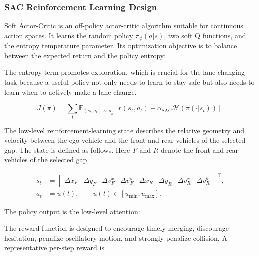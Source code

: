 \subsubsection{SAC Reinforcement Learning Design}





Soft Actor-Critic is an off-policy actor-critic algorithm suitable for continuous action spaces. It learns the random policy \(\pi_\phi(a|s)\), two soft Q functions, and the entropy temperature parameter. Its optimization objective is to balance between the expected return and the policy entropy:

The entropy term promotes exploration, which is crucial for the lane-changing task because a useful policy not only needs to learn to stay safe but also needs to learn when to actively make a lane change.



{\small
\begin{equation}
J(\pi) =
\sum_{t}
\mathbb{E}_{(s_t,a_t)\sim\rho_{\pi}}
\left[
r(s_t,a_t)
+\alpha_{\mathrm{SAC}}\mathcal{H}\left(\pi(\cdot|s_t)\right)
\right].
\end{equation}
}





The low-level reinforcement-learning state describes the relative geometry and velocity between the ego vehicle and the front and rear vehicles of the selected gap. The state is defined as follows. Here \(F\) and \(R\) denote the front and rear vehicles of the selected gap. 



{\small
\begin{equation}
\begin{aligned}
s_t &= \begin{bmatrix}
\Delta x_F & \Delta y_F & \Delta v_F^x & \Delta v_F^y &
\Delta x_R & \Delta y_R & \Delta v_R^x & \Delta v_R^y
\end{bmatrix}^{\top},\\
a_t &= u(t),\qquad u(t)\in[u_{\min},u_{\max}].
\end{aligned}
\end{equation}
}





The policy output is the low-level attention:





The reward function is designed to encourage timely merging, discourage hesitation, penalize oscillatory motion, and strongly penalize collision. A representative per-step reward is



